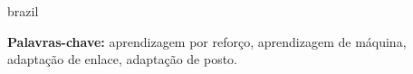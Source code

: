 \begin{resumo}[Resumo]
\begin{otherlanguage*}{brazil}
%
%


\vspace*{2ex}
\textbf{Palavras-chave: } aprendizagem por reforço, aprendizagem de máquina, adaptação de enlace, adaptação de posto.

\end{otherlanguage*}
\end{resumo}
